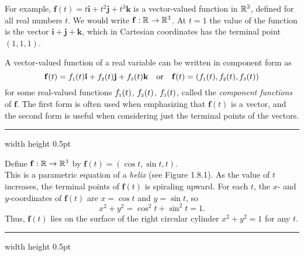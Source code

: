For example, $\mathbf{f}(t) = t \mathbf{i} + t^2 \mathbf{j} + t^3 \mathbf{k}$ is a vector-valued function in $\mathbb{R}^{3}$,
defined for all real numbers $t$. 
We would write $\mathbf{f}: \mathbb{R}^{} \rightarrow \mathbb{R}^{3}$. 
At $t = 1$
the value of the function is the vector $\mathbf{i} + \mathbf{j} + \mathbf{k}$, which in Cartesian coordinates has the
terminal point $(1,1,1)$.

A vector-valued function of a real variable can be written in component form as
\begin{displaymath}
 \mathbf{f}(t) = f_{\scriptscriptstyle 1}(t) \mathbf{i} + f_{\scriptscriptstyle 2}(t) \mathbf{j} + f_{\scriptscriptstyle 3}(t) \mathbf{k}\quad\text{or}\quad\mathbf{f}(t) = ( f_{\scriptscriptstyle 1}(t),f_{\scriptscriptstyle 2}(t),f_{\scriptscriptstyle 3}(t) )
\end{displaymath}
for some real-valued functions $f_{\scriptscriptstyle 1}(t)$, $f_{\scriptscriptstyle 2}(t)$, $f_{\scriptscriptstyle 3}(t)$, called the \emph{component 
functions} of $\mathbf{f}$. 
The first form is often used when emphasizing that $\mathbf{f}(t)$ is a vector, and the second form is useful when considering just the terminal points of the vectors.

\smallskip
\hrule width \textwidth height 0.5pt
\piccaption[]{}
\begin{exmp}
 Define $\mathbf{f}: \mathbb{R} \rightarrow \mathbb{R}^{3}$ by $\mathbf{f}(t) = ( \cos t , \sin t , t )$.\\ 
 This is a parametric equation of a \emph{helix} (see Figure 1.8.1). 
 As the value of $t$ increases, the terminal points of
 $\mathbf{f}(t)$ is spiraling upward. 
 For each $t$, the $x$- and $y$-coordinates of $\mathbf{f}(t)$
 are $x = \cos t$ and $y = \sin t$, so
 \begin{displaymath}
 x^2 + y^2 = \cos^2 t + \sin^2 t = 1.
 \end{displaymath}
 Thus, $\mathbf{f}(t)$ lies on the surface of the right circular cylinder $x^2 + y^2 = 1$ for any $t$.
\end{exmp}
\hrule width \textwidth height 0.5pt
\smallskip

